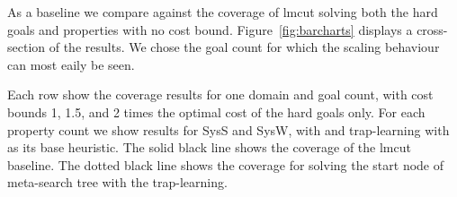 As a baseline we compare against the coverage of lmcut solving both the hard goals and properties with no cost bound. Figure~\ref{fig:barcharts} displays a cross-section of the results. We chose the goal count for which the scaling behaviour can most eaily be seen.

Each row show the coverage results for one domain and goal count, with cost bounds 1, 1.5, and 2 times the optimal cost of the hard goals only. For each property count we show results for SysS and SysW, with \hff and trap-learning with \hff as its base heuristic. The solid black line shows the coverage of the lmcut baseline. The dotted black line shows the coverage for solving the start node of meta-search tree with the trap-learning.


%

%

%

%
